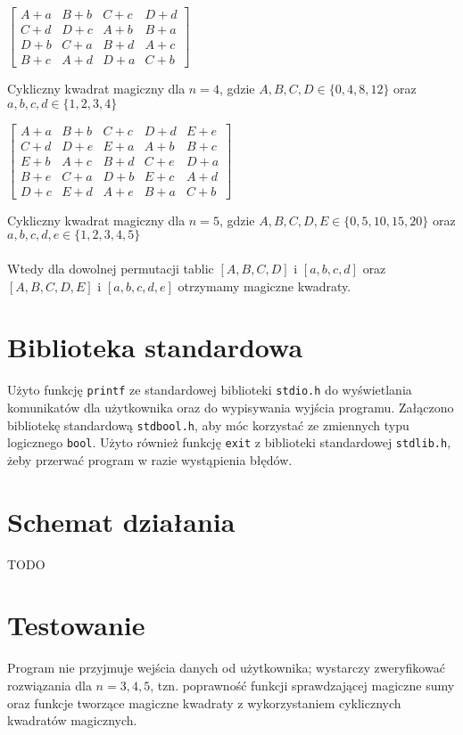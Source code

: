 \documentclass[a4paper, 12pt]{article}
\begin{document}
\begin{center}
	$\begin{bmatrix}
	A+a & B+b & C+c & D+d \\
	C+d & D+c & A+b & B+a \\
	D+b & C+a & B+d & A+c \\
	B+c & A+d & D+a & C+b
	\end{bmatrix}$
\end{center}
Cykliczny kwadrat magiczny dla $n=4$, gdzie $A,B,C,D\in\{0,4,8,12\}$ oraz $a,b,c,d\in\{1,2,3,4\}$
\begin{center}
	$\begin{bmatrix}
	A+a & B+b & C+c & D+d & E+e \\
	C+d & D+e & E+a & A+b & B+c \\
	E+b & A+c & B+d & C+e & D+a \\
	B+e & C+a & D+b & E+c & A+d \\
	D+c & E+d & A+e & B+a & C+b
	\end{bmatrix}$
\end{center}
Cykliczny kwadrat magiczny dla $n=5$, gdzie $A,B,C,D,E\in\{0,5,10,15,20\}$ oraz $a,b,c,d,e\in\{1,2,3,4,5\}$
\\\\
Wtedy dla dowolnej permutacji tablic $[A,B,C,D]$ i $[a,b,c,d]$ oraz $[A,B,C,D,E]$ i $[a,b,c,d,e]$ otrzymamy magiczne kwadraty.

\section*{Biblioteka standardowa}
Użyto funkcję \texttt{printf} ze standardowej biblioteki \texttt{stdio.h} do wyświetlania komunikatów dla użytkownika oraz do wypisywania wyjścia programu. Załączono bibliotekę standardową \texttt{stdbool.h}, aby móc korzystać ze zmiennych typu logicznego \texttt{bool}. Użyto również funkcję \texttt{exit} z biblioteki standardowej \texttt{stdlib.h}, żeby przerwać program w razie wystąpienia błędów.

\section*{Schemat działania}
TODO

\section*{Testowanie}
Program nie przyjmuje wejścia danych od użytkownika; wystarczy zweryfikować rozwiązania dla $n=3,4,5$, tzn. poprawność funkcji sprawdzającej magiczne sumy oraz funkcje tworzące magiczne kwadraty z wykorzystaniem cyklicznych kwadratów magicznych.
\end{document}

